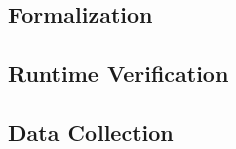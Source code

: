 \documentclass[aspectratio=169]{beamer}
\begin{document}
\subsection{Formalization}


\subsection{Runtime Verification}




\subsection{Data Collection}

\end{document}
